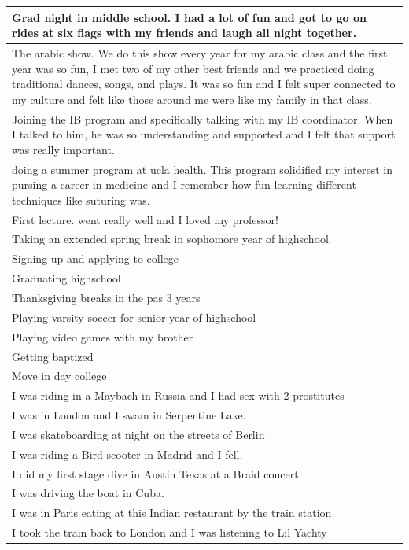 \documentclass[
  .7em,
  letterpaper,
  DIV=11,
  numbers=noendperiod]{scrartcl}
\begin{document}
\begin{table}
\begin{tabular}{l}
\hline
Grad night in middle school. I had a lot of fun and got to go on rides at six flags with my friends and laugh all night together.\\
\hline
The arabic show. We do this show every year for my arabic class and the first year was so fun, I met two of my other best friends and we practiced doing traditional dances, songs, and plays. It was so fun and I felt super connected to my culture and felt like those around me were like my family in that class.\\
\hline
Joining the IB program and specifically talking with my IB coordinator. When I talked to him, he was so understanding and supported and I felt that support was really important.\\
\hline
doing a summer program at ucla health. This program solidified my interest in pursing a career in medicine and I remember how fun learning different techniques like suturing was.\\
\hline
First lecture. went really well and I loved my professor!\\
\hline
Taking an extended spring break in sophomore year of highschool\\
\hline
Signing up and applying to college\\
\hline
Graduating highschool\\
\hline
Thanksgiving breaks in the pas 3 years\\
\hline
Playing varsity soccer for senior year of highschool\\
\hline
Playing video games with my brother\\
\hline
Getting baptized\\
\hline
Move in day college\\
\hline
I was riding in a Maybach in Russia and I had sex with 2 prostitutes\\
\hline
I was in London and I swam in Serpentine Lake.\\
\hline
I was skateboarding at night on the streets of Berlin\\
\hline
I was riding a Bird scooter in Madrid and I fell.\\
\hline
I did my first stage dive in Austin Texas at a Braid concert\\
\hline
I was driving the boat in Cuba.\\
\hline
I was in Paris eating at this Indian restaurant by the train station\\
\hline
I took the train back to London and I was listening to Lil Yachty\\

\end{tabular}
\end{table}
\end{document}

